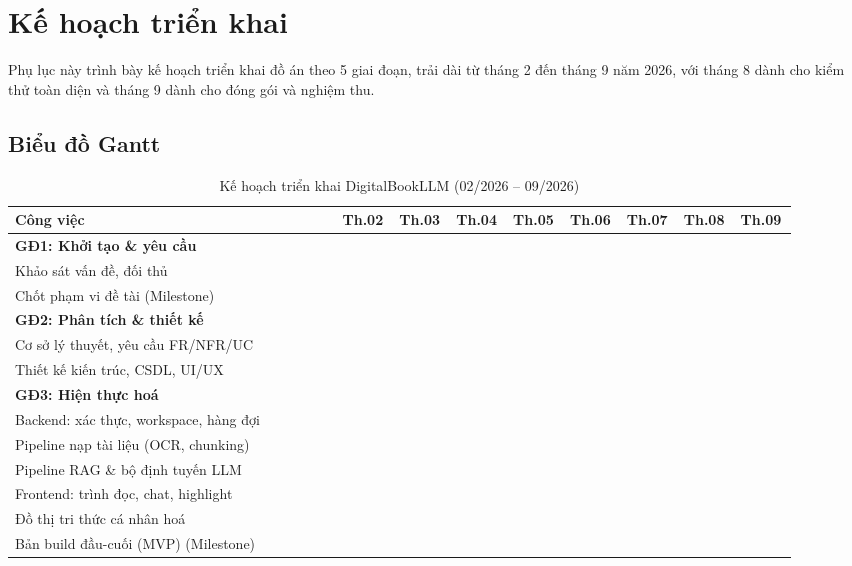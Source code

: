\chapter{Kế hoạch triển khai}
Phụ lục này trình bày kế hoạch triển khai đồ án theo 5 giai đoạn, trải dài từ tháng 2 đến tháng 9 năm 2026, với tháng 8 dành cho kiểm thử toàn diện và tháng 9 dành cho đóng gói và nghiệm thu.

\section{Biểu đồ Gantt}

\begin{landscape}
\begin{table}[p]
    \centering
    \caption{Kế hoạch triển khai DigitalBookLLM (02/2026 -- 09/2026)}
    \label{tab:gantt_table}
    \footnotesize
    \setlength{\tabcolsep}{3pt}
    \renewcommand{\arraystretch}{1.05}
    \begin{tabular}{|L{0.40\linewidth}|*{8}{C{0.064\linewidth}|}}
    \hline
    \textbf{Công việc} & \textbf{Th.02} & \textbf{Th.03} & \textbf{Th.04} & \textbf{Th.05} & \textbf{Th.06} & \textbf{Th.07} & \textbf{Th.08} & \textbf{Th.09} \\ \hline
    
    \textbf{GĐ1: Khởi tạo \& yêu cầu} & & & & & & & & \\ \hline
    Khảo sát vấn đề, đối thủ &  & & & & & & & \\ \hline
    Chốt phạm vi đề tài (Milestone) &  & & & & & & & \\ \hline
    
    \textbf{GĐ2: Phân tích \& thiết kế} & & & & & & & & \\ \hline
    Cơ sở lý thuyết, yêu cầu FR/NFR/UC & &  & & & & & & \\ \hline
    Thiết kế kiến trúc, CSDL, UI/UX & &  & & & & & & \\ \hline
    
    \textbf{GĐ3: Hiện thực hoá} & & & & & & & & \\ \hline
    Backend: xác thực, workspace, hàng đợi & & &  & & & & & \\ \hline
    Pipeline nạp tài liệu (OCR, chunking) & & &  &  & & & & \\ \hline
    Pipeline RAG \& bộ định tuyến LLM & & & &  &  & & & \\ \hline
    Frontend: trình đọc, chat, highlight & & & &  &  &  & & \\ \hline
    Đồ thị tri thức cá nhân hoá & & & & &  &  & & \\ \hline
    Bản build đầu-cuối (MVP) (Milestone)& & & & & &  & & \\ \hline
    

\end{tabular}
\end{table}
\end{landscape}
